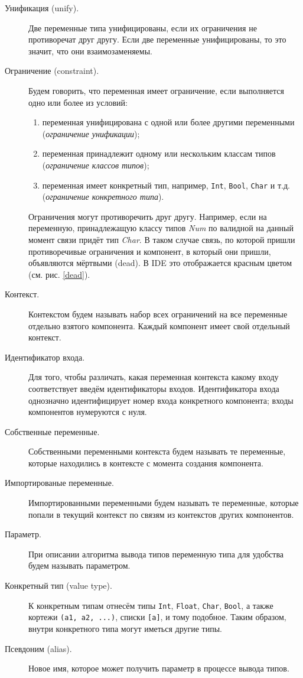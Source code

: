 \begin{description}
	\item[Унификация (unify).] Две переменные типа унифицированы, если их ограничения не противоречат друг другу. Если две переменные унифицированы, то это значит, что они взаимозаменяемы.
	\item[Ограничение (constraint).] Будем говорить, что переменная имеет ограничение, если выполняется одно или более из условий:
		\begin{enumerate}[1)]
			\item переменная унифицирована с одной или более другими переменными (\textit{ограничение унификации});
			\item переменная принадлежит одному или нескольким классам типов (\textit{ограничение классов типов});
			\item переменная имеет конкретный тип, например, \lstinline!Int!, \lstinline!Bool!, \lstinline!Char! и т.д. (\textit{ограничение конкретного типа}).
		\end{enumerate}  
	Ограничения могут противоречить друг другу. Например, если на переменную, принадлежащую классу типов \textit{Num} по валидной на данный момент связи придёт тип \textit{Char}. В таком случае связь, по которой пришли противоречивые ограничения и компонент, в который они пришли, объявляются мёртвыми (dead). В IDE это отображается красным цветом (см. рис. \ref{dead}).
	\item[Контекст.] Контекстом будем называть набор всех ограничений на все переменные отдельно взятого компонента. Каждый компонент имеет свой отдельный контекст.
	\item[Идентификатор входа.] Для того, чтобы различать, какая переменная контекста какому входу соответствует введём идентификаторы входов. Идентификатора входа однозначно идентифицирует номер входа конкретного компонента; входы компонентов нумеруются с нуля.
	\item[Собственные переменные.] Собственными переменными контекста будем называть те переменные, которые находились в контексте с момента создания компонента.
	\item[Импортированые переменные.] Импортированными переменными будем называть те переменные, которые попали в текущий контекст по связям из контекстов других компонентов.
	\item[Параметр.] При описании алгоритма вывода типов переменную типа для удобства будем называть параметром.
	\item[Конкретный тип (value type).] К конкретным типам отнесём типы \lstinline|Int|, \lstinline|Float|, \lstinline|Char|, \lstinline|Bool|, а также кортежи \lstinline|(a1, a2, ...)|, списки \lstinline|[a]|, и тому подобное. Таким образом, внутри конкретного типа могут иметься другие типы.
	\item[Псевдоним (alias).] Новое имя, которое может получить параметр в процессе вывода типов.
\end{description}

